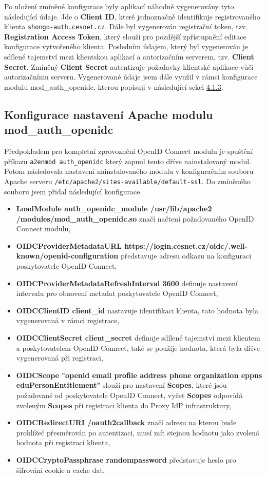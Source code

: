 \documentclass[
  printed, %
  twoside, %
  table,   %
  nolof,     %
  nolot,     %
]{fithesis3}
\begin{document}
Po uložení zmíněné konfigurace byly aplikací náhodně vygenerovány tyto následující údaje. Jde o \textbf{Client ID}, které jednoznačně identifikuje registrovaného klienta \texttt{shongo-auth.cesnet.cz}. Dále byl vygenerován registrační token, tzv. \textbf{Registration Access Token}, který slouží pro pozdější zpřístupnění editace konfigurace vytvořeného klienta. Posledním údajem, který byl vygenerován je sdílené tajemství mezi klientskou aplikací a autorizačním serverem, tzv. \textbf{Client Secret}. Zmíněný \textbf{Client Secret} autentizuje požadavky klientské aplikace vůči autorizačnímu serveru. Vygenerované údaje jsem dále využil v rámci konfigurace modulu mod\_auth\_openidc, kterou popisuji v následující sekci \hyperref[sec:mod-conf]{4.1.3}.

\subsection{Konfigurace nastavení Apache modulu mod\_auth\_openidc} 
\label{sec:mod-conf}
Předpokladem pro kompletní zprovoznění OpenID Connect modulu je spuštění příkazu \texttt{a2enmod auth\_openidc} který zapnul tento dříve nainstalovaný modul. Potom následovala nastavení nainstalovaného modulu v konfiguračním souboru Apache serveru \texttt{/etc/apache2/sites-available/default-ssl}. Do zmíněného souboru jsem přidal následující konfigurace.

\begin{itemize}
    \item \textbf{LoadModule auth\_openidc\_module /usr/lib/apache2\\ /modules/mod\_auth\_openidc.so} značí načtení požadovaného OpenID Connect modulu, 
    \item \textbf{OIDCProviderMetadataURL https://login.cesnet.cz/oidc/.well-known/openid-configuration} představuje adresu odkazu na konfiguraci poskytovatele OpenID Connect, 
    \item \textbf{OIDCProviderMetadataRefreshInterval 3600} definuje nastavení intervalu pro obnovení metadat poskytovatele OpenID Connect, 
    \item \textbf{OIDCClientID client\_id} nastavuje identifikaci klienta, tato hodnota byla vygenerovaná v rámci registrace,
    \item \textbf{OIDCClientSecret client\_secret} definuje sdílené tajemství mezi klientem a poskytovatelem OpenID Connect, také se použije hodnota, která byla dříve vygenerovaná při registraci,
    \item \textbf{OIDCScope "openid email profile address phone organization eppns eduPersonEntitlement"} slouží pro nastavení \textbf{Scopes}, které jsou požadované od poskytovatele OpenID Connect, vyčet \textbf{Scopes} odpovídá zvoleným \textbf{Scopes} při registraci klienta do Proxy IdP infrastruktury,
    \item \textbf{OIDCRedirectURI /oauth2callback} značí adresu na kterou bude prohlížeč přesměrován po autentizaci, musí mít stejnou hodnotu jako zvolená hodnota při registraci klienta, 
    \item \textbf{OIDCCryptoPassphrase randompassword} představuje heslo pro šifrování cookie a cache dat. 
\end{itemize}
\end{document}
